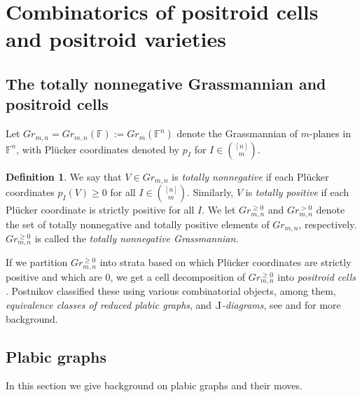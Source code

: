 \documentclass{amsart}
\def\Le{\hbox{\rotatebox[origin=c]{180}{$\Gamma$}}}
\theoremstyle{definition}
\newtheorem{definition}[thm]{Definition}
\numberwithin{equation}{section}
\newcommand{\Comment}[1]{{\color{blue} \sf ($\clubsuit$ #1 $\clubsuit$)}}
\begin{document}
\section{Combinatorics of positroid cells 
and positroid varieties}\label{sec:appendix}



\subsection{The totally nonnegative Grassmannian
and positroid cells}\label{sec:positroid}


Let $Gr_{m,n} = Gr_{m,n}(\mathbb{F}):=Gr_m(\mathbb{F}^n)$
denote the Grassmannian of $m$-planes in $\mathbb{F}^n$, with 
Pl\"ucker coordinates
denoted by $p_{I}$ for $I \in {[n] \choose m}$.

\begin{definition}\cite{Lusztig3, Postnikov}
	We say that $V\in Gr_{m,n}$ is \emph{totally nonnegative}
	if each Pl\"ucker coordinates $p_I(V)\geq 0$ for 
	all $I\in {[n] \choose m}$.
	Similarly, $V$ is \emph{totally positive} if each Pl\"ucker
	coordinate is strictly positive for all $I$.
	We let 
	$Gr_{m,n}^{\geq 0}$
	and 
	$Gr_{m,n}^{>0}$ denote the set of totally nonnegative
	and totally positive elements of $Gr_{m,n}$, respectively.
	$Gr_{m,n}^{\geq 0}$ is called the \emph{totally nonnegative 
	Grassmannian.}
\end{definition}

If we partition 
$Gr_{m,n}^{\geq 0}$ 
into strata based on which Pl\"ucker 
coordinates are strictly positive and which are $0$, 
we get a cell decomposition of 
$Gr_{m,n}^{\geq 0}$  into \emph{positroid cells}
\cite{Postnikov}. Postnikov classified these using  various 
combinatorial objects, among them, 
\emph{equivalence classes of reduced plabic graphs}, and 
\emph{$\Le$-diagrams}, see \cite{Postnikov} and 
\cite{FWZ4} for more background.



\subsection{Plabic graphs}\label{sec:plabic}

In this section we give background on plabic graphs and their moves.
\end{document}
